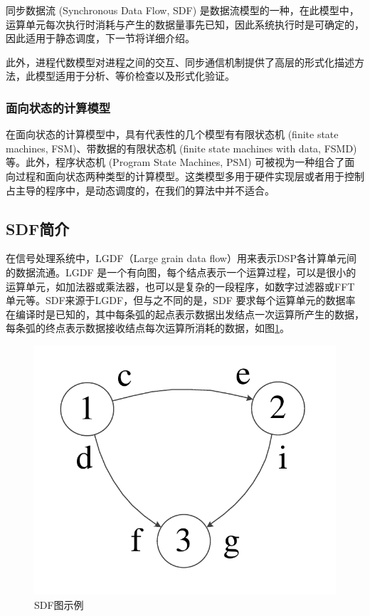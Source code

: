 同步数据流 (Synchronous Data Flow, SDF) 是数据流模型的一种，在此模型中，运算单元每次执行时消耗与产生的数据量事先已知，因此系统执行时是可确定的，因此适用于静态调度，下一节将详细介绍。

此外，进程代数模型对进程之间的交互、同步通信机制提供了高层的形式化描述方法，此模型适用于分析、等价检查以及形式化验证。

\subsubsection{面向状态的计算模型}
在面向状态的计算模型中，具有代表性的几个模型有有限状态机 (finite state machines, FSM)、带数据的有限状态机 (finite state machines with data, FSMD) 等。此外，程序状态机 (Program State Machines, PSM) 可被视为一种组合了面向过程和面向状态两种类型的计算模型。这类模型多用于硬件实现层或者用于控制占主导的程序中，是动态调度的，在我们的算法中并不适合。


\subsection{SDF简介}
\label{SDF-intro}

在信号处理系统中，LGDF（Large grain data flow）用来表示DSP各计算单元间的数据流通。LGDF 是一个有向图，每个结点表示一个运算过程，可以是很小的运算单元，如加法器或乘法器，也可以是复杂的一段程序，如数字过滤器或FFT单元等。SDF来源于LGDF，但与之不同的是，SDF 要求每个运算单元的数据率在编译时是已知的，其中每条弧的起点表示数据出发结点一次运算所产生的数据，每条弧的终点表示数据接收结点每次运算所消耗的数据，如图\ref{basic-SDF-sample}。

\begin{figure}[!htb]
  \centering
  \includegraphics[height=15ex]{figure/basic-1-SDF.pdf}
  \caption{SDF图示例}
  \label{basic-SDF-sample}
\end{figure}


